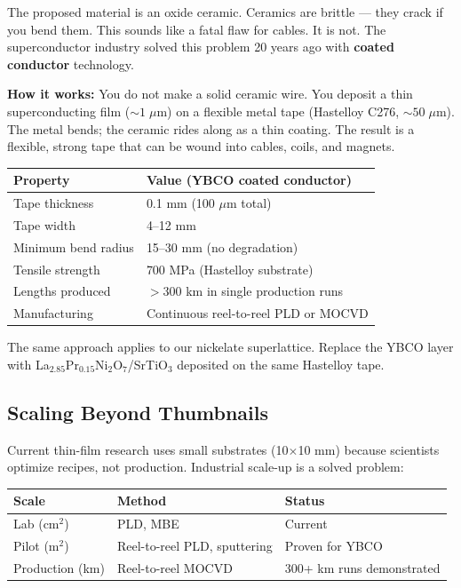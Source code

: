 \documentclass[11pt, a4paper]{article}
\begin{document}
The proposed material is an oxide ceramic. Ceramics are brittle ---
they crack if you bend them. This sounds like a fatal flaw for
cables. It is not. The superconductor industry solved this problem
20 years ago with \textbf{coated conductor} technology.

\textbf{How it works:} You do not make a solid ceramic wire. You
deposit a thin superconducting film ($\sim 1\;\mu$m) on a flexible
metal tape (Hastelloy C276, $\sim 50\;\mu$m). The metal bends; the
ceramic rides along as a thin coating. The result is a flexible,
strong tape that can be wound into cables, coils, and magnets.

\begin{center}
\begin{tabular}{@{}ll@{}}
\toprule
\textbf{Property} & \textbf{Value (YBCO coated conductor)} \\
\midrule
Tape thickness & 0.1 mm (100 $\mu$m total) \\
Tape width & 4--12 mm \\
Minimum bend radius & 15--30 mm (no degradation) \\
Tensile strength & 700 MPa (Hastelloy substrate) \\
Lengths produced & $> 300$ km in single production runs \\
Manufacturing & Continuous reel-to-reel PLD or MOCVD \\
\bottomrule
\end{tabular}
\end{center}

The same approach applies to our nickelate superlattice. Replace
the YBCO layer with La$_{2.85}$Pr$_{0.15}$Ni$_2$O$_7$/SrTiO$_3$
deposited on the same Hastelloy tape.

\subsection{Scaling Beyond Thumbnails}

Current thin-film research uses small substrates (10$\times$10 mm)
because scientists optimize recipes, not production. Industrial
scale-up is a solved problem:

\begin{center}
\begin{tabular}{@{}lll@{}}
\toprule
\textbf{Scale} & \textbf{Method} & \textbf{Status} \\
\midrule
Lab (cm$^2$) & PLD, MBE & Current \\
Pilot (m$^2$) & Reel-to-reel PLD, sputtering & Proven for YBCO \\
Production (km) & Reel-to-reel MOCVD & 300+ km runs demonstrated \\
\bottomrule
\end{tabular}
\end{center}
\end{document}
